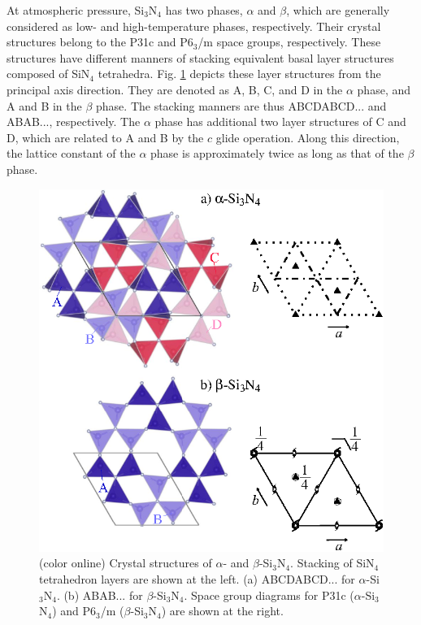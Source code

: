 \documentclass[twocolumn,amsmath,amssymb,a4paper,prb,superscriptaddress,floatfix]{revtex4-1}
\begin{document}
At atmospheric pressure, Si$_3$N$_4$ has two phases, $\alpha$ and $\beta$, which
are generally considered as low- and high-temperature phases,
respectively.\cite{zhou,hirosaki-md,riley} Their crystal structures belong to
the P31c and P6$_3$/m space groups, respectively.\cite{yashima,boulay} These
structures have different manners of stacking equivalent basal layer structures
composed of SiN$_4$ tetrahedra.\cite{hampshire} Fig. \ref{fig:Fig1_cryst}
depicts these layer structures from the principal axis direction. They are
denoted as A, B, C, and D in the $\alpha$ phase, and A and B in the $\beta$
phase. The stacking manners are thus ABCDABCD... and ABAB..., respectively. The
$\alpha$ phase has additional two layer structures of C and D, which are related
to A and B by the $c$ glide operation.\cite{hampshire} Along this direction, the
lattice constant of the $\alpha$ phase is approximately twice as long as that of
the $\beta$ phase.
\begin{figure}[ht]
 \begin{center}
  \includegraphics[width=0.90\linewidth]{Fig1_crystal_str2.eps} \caption{(color
  online) Crystal structures of $\alpha$- and $\beta$-Si$_3$N$_4$. Stacking of
  SiN$_4$ tetrahedron layers are shown at the left. (a) ABCDABCD... for
  $\alpha$-Si$_3$N$_4$. (b) ABAB... for $\beta$-Si$_3$N$_4$.  Space group
  diagrams\cite{inttableA} for P31c ($\alpha$-Si$_3$N$_4$) and P6$_3$/m ($\beta$-Si$_3$N$_4$)
  are shown at the right.}
  \label{fig:Fig1_cryst} 
 \end{center}
\end{figure}
\end{document}
